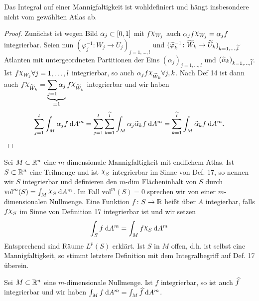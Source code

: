 \documentclass[skript.tex]{subfiles}
\begin{document}
	\begin{lem}
		Das Integral auf einer Mannigfaltigkeit ist wohldefiniert und hängt insbesondere nicht vom gewählten Atlas ab.
		
		\begin{proof}
			Zunächst ist wegen Bild $\alpha_j \subset [0,1]$ mit $f \rchi_{W_j}$ auch $\alpha_j f \rchi_{W_j} = \alpha_j f$ integrierbar. Seien nun $(\varphi_j^{-1} \colon W_j \to U_j)_{j=1, \dots, l}$ und $(\widetilde{\varphi}_k^{-1} \colon \widetilde{W}_k \to \widetilde{U}_k)_{k=1, \dots, \widetilde{l}}$ Atlanten mit untergeordneten Partitionen der Eins $(\alpha_j)_{j = 1, \dots, l}$ und  $(\widetilde{\alpha}_k)_{k = 1, \dots, \widetilde{l}}$. Ist $f \rchi_{W_j} \forall j = 1, \dots, l $ integrierbar, so auch $\alpha_j f \rchi_{\wt{W}_k} 
			\forall j,k$. Nach Def 14 ist dann auch $f \rchi_{\wt{W}_k} = \underbrace{\sum_{j=1} \alpha_j }_{\equiv 1} f \rchi_{\wt{W}_k}$ integrierbar und wir haben 
			\[
				\sum_{j=1}^{l} \int_M \alpha_j f \: \mathrm{d} A^m = \sum_{j=1}^{l} \sum_{k=1}^{\widetilde{l}} \int_M \alpha_j \widetilde{\alpha}_k f \: \mathrm{d} A^m =\sum_{k=1}^{\widetilde{l}} \int_M \widetilde{\alpha}_k f \: \mathrm{d} A^m.
			\]
			\end{proof}
	\end{lem}
	
	\begin{defin}
		Sei $M \subset {\mathbb{R}^n}$ eine $m$-dimensionale Mannigfaltigkeit mit endlichem Atlas. Ist $S \subset {\mathbb{R}^n}$ eine Teilmenge und ist $\rchi_S$ integrierbar im Sinne von Def. 17, so nennen wir $S$ integrierbar und definieren den $m$-dim Flächeninhalt von $S$ durch $\text{vol}^m(S) = \int_M \rchi_S \md A^m$. Im Fall $\text{vol}^m(S)=0$ sprechen wir von einer $m$-dimensionalen Nullmenge. Eine Funktion $ f \colon S \to \mathbb{R}$ heißt über $A$ integierbar, falls $f \rchi_S$ im Sinne von Definition 17 integrierbar ist und wir setzen
		\begin{equation*}
		\int_S f \md A^m = \int_M f \rchi_S \md A ^m
		\end{equation*}
		Entsprechend sind Räume $L^p(S)$ erklärt. Ist $S$ in $M$ offen, d.h. ist selbst eine Mannigfaltigkeit, so stimmt letztere Definition mit dem Integralbegriff auf Def. 17 überein.
	\end{defin}
	
	\begin{lem}
Sei $M \subset  {\mathbb{R}^n}$ eine $m$-dimensionale Nullmenge. Ist $f$ integrierbar, so ist auch $\widehat{f}$ integrierbar und wir haben $\int_M f \: \mathrm{d} A^m = \int_M \widehat{f} \: \mathrm{d} A^m$.
	\end{lem}
\end{document}
